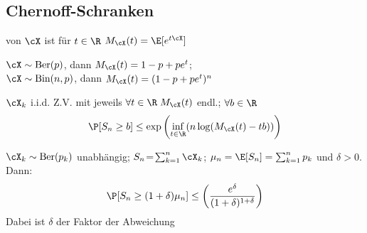 \subsection{Chernoff-Schranken}
 von $\cX$ ist für $t \in \R$ $M_\cX(t) = \E[e^{t\cX}]$

\shortexample $\cX \sim \text{Ber}(p)$, dann $M_\cX(t) = 1 - p + p e^t$;\\
$\cX \sim \text{Bin}(n, p)$, dann $M_\cX(t) = (1 - p + pe^t)^n$

 $\cX_k$ i.i.d. Z.V. mit jeweils $\forall t \in \R \; M_\cX(t)$ endl.; $\forall b \in \R$
\[
    \P[S_n \geq b] \leq \exp \left( \inf_{t \in \R}(n \log(M_\cX(t) - tb)) \right)
\]

 $\cX_k \sim \text{Ber}(p_k)$ unabhängig; $S_n\! = \! \sum_{k = 1}^{n} \cX_k$; $\mu_n = \E[S_n] = \sum_{k = 1}^{n} p_k$ und $\delta > 0$. Dann:
\[
    \P[S_n \geq (1 + \delta) \mu_n] \leq \left( \frac{e^\delta}{(1 + \delta)^{1 + \delta}} \right)
\]
Dabei ist $\delta$ der Faktor der Abweichung

